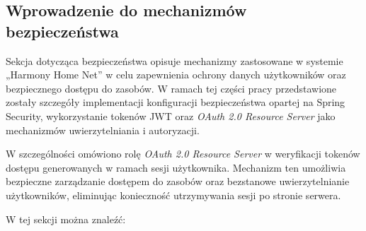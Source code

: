 \subsection{Wprowadzenie do mechanizmów bezpieczeństwa}

Sekcja dotycząca bezpieczeństwa opisuje mechanizmy zastosowane w systemie „Harmony Home Net” w celu zapewnienia ochrony danych użytkowników oraz bezpiecznego dostępu do zasobów. W ramach tej części pracy przedstawione zostały szczegóły implementacji konfiguracji bezpieczeństwa opartej na Spring Security, wykorzystanie tokenów JWT oraz \emph{OAuth 2.0 Resource Server} jako mechanizmów uwierzytelniania i autoryzacji.

W szczególności omówiono rolę \emph{OAuth 2.0 Resource Server} w weryfikacji tokenów dostępu generowanych w ramach sesji użytkownika. Mechanizm ten umożliwia bezpieczne zarządzanie dostępem do zasobów oraz bezstanowe uwierzytelnianie użytkowników, eliminując konieczność utrzymywania sesji po stronie serwera.

W tej sekcji można znaleźć:

